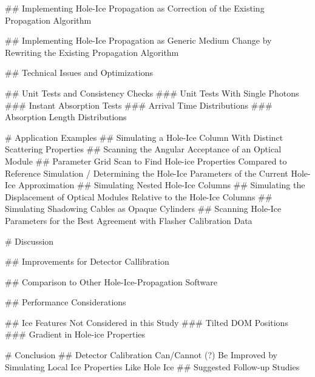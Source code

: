 
## Implementing Hole-Ice Propagation as Correction of the Existing Propagation Algorithm

## Implementing Hole-Ice Propagation as Generic Medium Change by Rewriting the Existing Propagation Algorithm

## Technical Issues and Optimizations

## Unit Tests and Consistency Checks
### Unit Tests With Single Photons
### Instant Absorption Tests
### Arrival Time Distributions
### Absorption Length Distributions

# Application Examples
## Simulating a Hole-Ice Column With Distinct Scattering Properties
## Scanning the Angular Acceptance of an Optical Module
## Parameter Grid Scan to Find Hole-ice Properties Compared to Reference Simulation / Determining the Hole-Ice Parameters of the Current Hole-Ice Approximation
## Simulating Nested Hole-Ice Columns
## Simulating the Displacement of Optical Modules Relative to the Hole-Ice Columns
## Simulating Shadowing Cables as Opaque Cylinders
## Scanning Hole-Ice Parameters for the Best Agreement with Flasher Calibration Data

# Discussion

## Improvements for Detector Callibration

## Comparison to Other Hole-Ice-Propagation Software

## Performance Considerations

## Ice Features Not Considered in this Study
### Tilted DOM Positions
### Gradient in Hole-ice Properties

# Conclusion
## Detector Calibration Can/Cannot (?) Be Improved by Simulating Local Ice Properties Like Hole Ice
## Suggested Follow-up Studies
